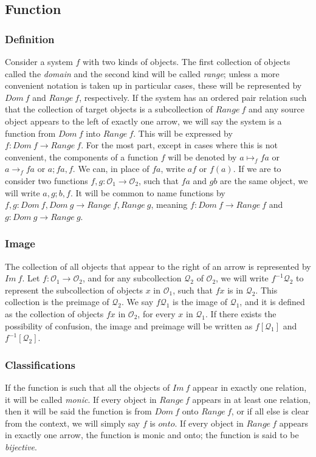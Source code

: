 \documentclass [12pt]{book}
\begin{document}
		\subsection{Function}

\subsubsection{Definition} 

Consider a system $f$ with two kinds of objects. The first collection of objects called the \textit{domain} and the second kind will be called \textit{range}; unless a more convenient notation is taken up in particular cases, these will be represented by $Dom~f$ and $Range~f$, respectively. If the system has an ordered pair relation such that the collection of target objects is a subcollection of $Range~f$ and any source object appears to the left of exactly one arrow, we will say the system is a function from $Dom~f$ into $Range~f$. This will be expressed by $f:Dom~f\rightarrow Range~f$. For the most part, except in cases where this is not convenient, the components of a function $f$ will be denoted by $a\mapsto_{f}fa$ or $a\rightarrow_ffa$ or $a;fa,f$. We can, in place of $fa$, write $af$ or $f(a)$. If we are to consider two functions $f,g:\mathcal{O}_{1}\rightarrow\mathcal{O}_{2}$, such that $fa$ and $gb$ are the same object, we will write $a,g;b,f$. It will be common to name functions by $f,g:Dom~f,Dom~g\rightarrow Range~f,Range~g$, meaning $f:Dom~f\rightarrow Range~f$ and $g:Dom~g\rightarrow Range~g$.

\subsubsection{Image} The collection of all objects that appear to the right of an arrow is represented by $Im~f$. Let $f:\mathcal{O}_{1}\rightarrow\mathcal{O}_{2}$, and for any subcollection $\mathcal{Q}_{2}$ of $\mathcal{O}_{2}$, we will write $f^{-1}\mathcal{Q}_{2}$ to represent the subcollection of objects $x$ in $\mathcal O_1$, such that $fx$ is in $\mathcal{Q}_{2}$. This collection is the preimage of $\mathcal Q_2$. We say $f\mathcal{Q}_{1}$ is the image of $\mathcal Q_1$, and it is defined as the collection of objects $fx$ in $\mathcal{O}_{2}$, for every $x$ in $\mathcal{Q}_{1}$. If there exists the possibility of confusion, the image and preimage will be written as $f[\mathcal{Q}_{1}]$ and $f^{-1}[\mathcal{Q}_{2}]$.

\subsubsection{Classifications} If the function is such that all the objects of $Im~f$ appear in exactly one relation, it will be called \textit{monic}. If every object in $Range~f$ appears in at least one relation, then it will be said the function is from $Dom~f$ onto $Range~f$, or if all else is clear from the context, we will simply say $f$ is  $onto$. If every object in $Range~f$ appears in exactly one arrow, the function is monic and onto; the function is said to be \textit{bijective}.
\end{document}
